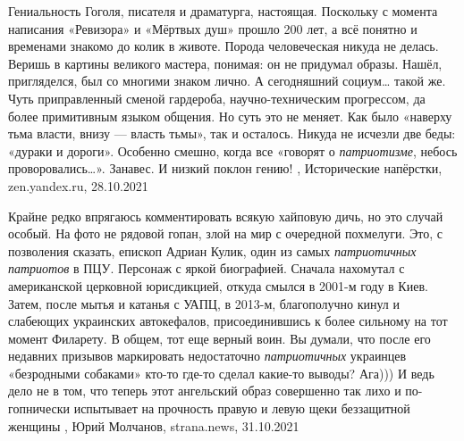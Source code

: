 Гениальность Гоголя, писателя и драматурга, настоящая. Поскольку с момента
написания «Ревизора» и «Мёртвых душ» прошло 200 лет, а всё понятно и временами
знакомо до колик в животе. Порода человеческая никуда не делась. Веришь в
картины великого мастера, понимая: он не придумал образы. Нашёл, пригляделся,
был со многими знаком лично. А сегодняшний социум… такой же. Чуть приправленный
сменой гардероба, научно-техническим прогрессом, да более примитивным языком
общения.  Но суть это не меняет. Как было «наверху тьма власти, внизу — власть
тьмы», так и осталось. Никуда не исчезли две беды: «дураки и дороги». Особенно
смешно, когда все «говорят о \emph{патриотизме}, небось проворовались…».
Занавес. И низкий поклон гению!
, 
Исторические напёрстки, zen.yandex.ru, 28.10.2021

Крайне редко впрягаюсь комментировать всякую хайповую дичь, но это случай
особый.  На фото не рядовой гопан, злой на мир с очередной похмелуги. Это, с
позволения сказать, епископ Адриан Кулик, один из самых \emph{патриотичных
патриотов} в ПЦУ.  Персонаж с яркой биографией. Сначала нахомутал с
американской церковной юрисдикцией, откуда смылся в 2001-м году в Киев. Затем,
после мытья и катанья с УАПЦ, в 2013-м, благополучно кинул и слабеющих
украинских автокефалов, присоединившись к более сильному на тот момент
Филарету. В общем, тот еще верный воин.  Вы думали, что после его недавних
призывов маркировать недостаточно \emph{патриотичных} украинцев «безродными
собаками» кто-то где-то сделал какие-то выводы? Ага))) И ведь дело не в том,
что теперь этот ангельский образ совершенно так лихо и по-гопнически испытывает
на прочность правую и левую щеки беззащитной женщины
, 
Юрий Молчанов, strana.news, 31.10.2021
